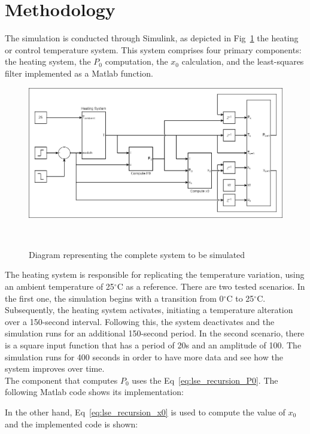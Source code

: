 \section{Methodology}
The simulation is conducted through Simulink, as depicted in Fig~\ref{fig:heat_system_diagram} the heating or control temperature system. This system comprises four primary components: the heating system, the $P_{0}$ computation, the $x_{0}$ calculation, and the least-squares filter implemented as a Matlab function.

\begin{figure}[H]
\centering
\includegraphics[width=1\linewidth]{figures/heat_system_diagram.png}
\caption{Diagram representing the complete system to be simulated}
~\label{fig:heat_system_diagram}
\end{figure}

The heating system is responsible for replicating the temperature variation, using an ambient temperature of 25$^{\circ}$C as a reference. There are two tested scenarios. In the first one, the simulation begins with a transition from 0$^{\circ}$C to 25$^{\circ}$C. Subsequently, the heating system activates, initiating a temperature alteration over a 150-second interval. Following this, the system deactivates and the simulation runs for an additional 150-second period. In the second scenario, there is a square input function that has a period of 20s and an amplitude of 100. The simulation runs for 400 seconds in order to have more data and see how the system improves over time. \\

The component that computes $P_{0}$ uses the Eq~\ref{eq:lse_recursion_P0}. The following Matlab code shows its implementation:



In the other hand, Eq~\ref{eq:lse_recursion_x0} is used to compute the value of $x_{0}$ and the implemented code is shown:


